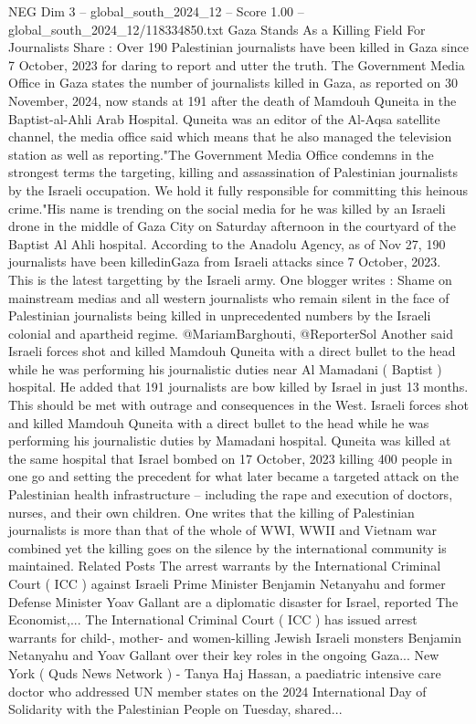 \begin{textsample}{NEG Dim 3 – global\_south\_2024\_12 – Score 1.00 – global\_south\_2024\_12/118334850.txt}  \label{ex:f3_neg_065}
Gaza Stands As a Killing Field For Journalists Share : Over 190 Palestinian journalists have been killed in Gaza since 7 October, 2023 for daring to report and utter the truth.
The Government Media Office in Gaza states the number of journalists killed in Gaza, as reported on 30 November, 2024, now stands at 191 after the death of Mamdouh Quneita in the Baptist-al-Ahli Arab Hospital.
Quneita was an editor of the Al-Aqsa satellite channel, the media office said which means that he also managed the television station as well as reporting."The Government Media Office condemns in the strongest terms the targeting, killing and assassination of Palestinian journalists by the Israeli occupation.
We hold it fully responsible for committing this heinous crime."His name is trending on the social media for he was killed by an Israeli drone in the middle of Gaza City on Saturday afternoon in the courtyard of the Baptist Al Ahli hospital.
According to the Anadolu Agency, as of Nov 27, 190 journalists have been killedinGaza from Israeli attacks since 7 October, 2023.
This is the latest targetting by the Israeli army.
One blogger writes : Shame on mainstream medias and all western journalists who remain silent in the face of Palestinian journalists being killed in unprecedented numbers by the Israeli colonial and apartheid regime. @MariamBarghouti, @ReporterSol Another said Israeli forces shot and killed Mamdouh Quneita with a direct bullet to the head while he was performing his journalistic duties near Al Mamadani ( Baptist ) hospital.
He added that 191 journalists are bow killed by Israel in just 13 months.
This should be met with outrage and consequences in the West.
Israeli forces shot and killed Mamdouh Quneita with a direct bullet to the head while he was performing his journalistic duties by Mamadani hospital.
Quneita was killed at the same hospital that Israel bombed on 17 October, 2023 killing 400 people in one go and setting the precedent for what later became a targeted attack on the Palestinian health infrastructure -- including the rape and execution of doctors, nurses, and their own children.
One writes that the killing of Palestinian journalists is more than that of the whole of WWI, WWII and Vietnam war combined yet the killing goes on the silence by the international community is maintained.
Related Posts The arrest warrants by the International Criminal Court ( ICC ) against Israeli Prime Minister Benjamin Netanyahu and former Defense Minister Yoav Gallant are a diplomatic disaster for Israel, reported The Economist,...
The International Criminal Court ( ICC ) has issued arrest warrants for child-, mother- and women-killing Jewish Israeli monsters Benjamin Netanyahu and Yoav Gallant over their key roles in the ongoing Gaza...
New York ( Quds News Network ) - Tanya Haj Hassan, a paediatric intensive care doctor who addressed UN member states on the 2024 International Day of Solidarity with the Palestinian People on Tuesday, shared...

\end{textsample}
